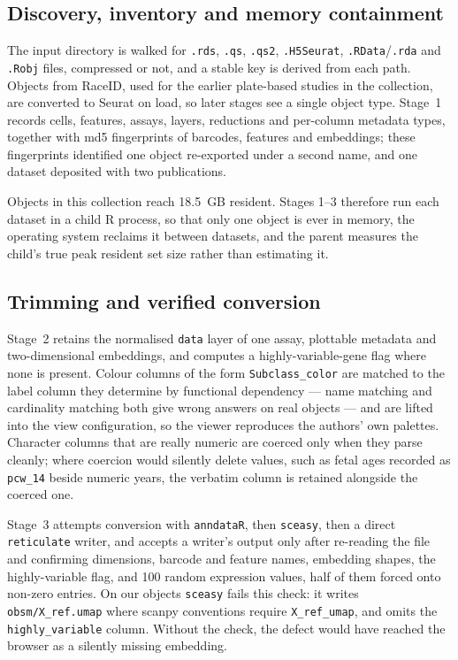 \subsection{Discovery, inventory and memory containment}

The input directory is walked for \texttt{.rds}, \texttt{.qs}, \texttt{.qs2},
\texttt{.H5Seurat}, \texttt{.RData}/\texttt{.rda} and \texttt{.Robj} files,
compressed or not, and a stable key is derived from each path. Objects from
RaceID, used for the earlier plate-based studies in the collection, are
converted to Seurat on load, so later stages see a single object type. Stage~1
records cells, features, assays, layers, reductions and per-column metadata
types, together with md5 fingerprints of barcodes, features and embeddings;
these fingerprints identified one object re-exported under a second name, and
one dataset deposited with two publications.

Objects in this collection reach 18.5~GB resident. Stages 1--3 therefore run
each dataset in a child R process, so that only one object is ever in memory,
the operating system reclaims it between datasets, and the parent measures the
child's true peak resident set size rather than estimating it.

\subsection{Trimming and verified conversion}

Stage~2 retains the normalised \texttt{data} layer of one assay, plottable
metadata and two-dimensional embeddings, and computes a highly-variable-gene
flag where none is present. Colour columns of the form \texttt{Subclass\_color}
are matched to the label column they determine by functional dependency --- name
matching and cardinality matching both give wrong answers on real objects ---
and are lifted into the view configuration, so the viewer reproduces the
authors' own palettes. Character columns that are really numeric are coerced
only when they parse cleanly; where coercion would silently delete values, such
as fetal ages recorded as \texttt{pcw\_14} beside numeric years, the verbatim
column is retained alongside the coerced one.

Stage~3 attempts conversion with \texttt{anndataR}, then \texttt{sceasy}, then a
direct \texttt{reticulate} writer, and accepts a writer's output only after
re-reading the file and confirming dimensions, barcode and feature names,
embedding shapes, the highly-variable flag, and 100 random expression values,
half of them forced onto non-zero entries. On our objects \texttt{sceasy} fails
this check: it writes \texttt{obsm/X\_ref.umap} where scanpy conventions
\citep{wolf2018scanpy} require \texttt{X\_ref\_umap}, and omits the
\texttt{highly\_variable} column. Without the check, the defect would have
reached the browser as a silently missing embedding.

